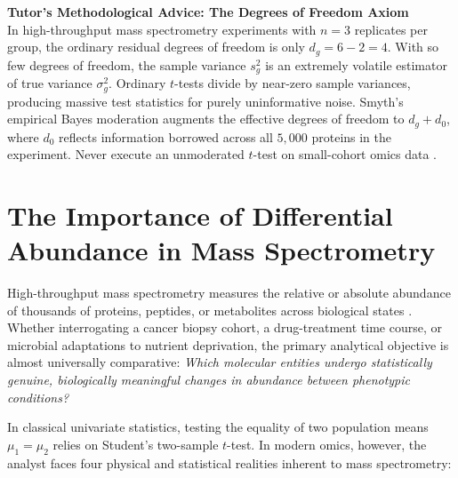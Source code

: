 \documentclass[11pt,twoside,openright]{book}
\begin{document}
\begin{notebox}
\textbf{Tutor's Methodological Advice: The Degrees of Freedom Axiom}\\
In high-throughput mass spectrometry experiments with $n = 3$ replicates per group, the ordinary residual degrees of freedom is only $d_g = 6 - 2 = 4$. With so few degrees of freedom, the sample variance $s_g^2$ is an extremely volatile estimator of true variance $\sigma_g^2$. Ordinary $t$-tests divide by near-zero sample variances, producing massive test statistics for purely uninformative noise. Smyth's empirical Bayes moderation augments the effective degrees of freedom to $d_g + d_0$, where $d_0$ reflects information borrowed across all $5{,}000$ proteins in the experiment. Never execute an unmoderated $t$-test on small-cohort omics data \cite{smyth2004linear, ritchie2015limma}.
\end{notebox}


\section{The Importance of Differential Abundance in Mass Spectrometry}

High-throughput mass spectrometry measures the relative or absolute abundance of thousands of proteins, peptides, or metabolites across biological states \cite{cox2008maxquant, demichev2020dia, gatto2023qfeatures}. Whether interrogating a cancer biopsy cohort, a drug-treatment time course, or microbial adaptations to nutrient deprivation, the primary analytical objective is almost universally comparative: \textit{Which molecular entities undergo statistically genuine, biologically meaningful changes in abundance between phenotypic conditions?}

In classical univariate statistics, testing the equality of two population means $\mu_1 = \mu_2$ relies on Student's two-sample $t$-test. In modern omics, however, the analyst faces four physical and statistical realities inherent to mass spectrometry:
\end{document}

